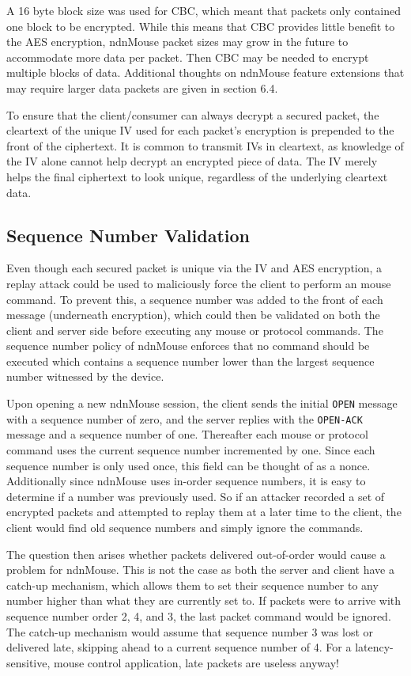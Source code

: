 \documentclass{sig-alternate}
\renewcommand\_{\textunderscore\allowbreak}  %
\begin{document}
A 16 byte block size was used for CBC, which meant that packets only contained one block to be encrypted. While this means that CBC provides little benefit to the AES encryption, ndnMouse packet sizes may grow in the future to accommodate more data per packet. Then CBC may be needed to encrypt multiple blocks of data. Additional thoughts on ndnMouse feature extensions that may require larger data packets are given in section 6.4.

To ensure that the client/consumer can always decrypt a secured packet, the cleartext of the unique IV used for each packet's encryption is prepended to the front of the ciphertext. It is common to transmit IVs in cleartext, as knowledge of the IV alone cannot help decrypt an encrypted piece of data. The IV merely helps the final ciphertext to look unique, regardless of the underlying cleartext data.

\subsection{Sequence Number Validation}
Even though each secured packet is unique via the IV and AES encryption, a replay attack could be used to maliciously force the client to perform an mouse command. To prevent this, a sequence number was added to the front of each message (underneath encryption), which could then be validated on both the client and server side before executing any mouse or protocol commands. The sequence number policy of ndnMouse enforces that no command should be executed which contains a sequence number lower than the largest sequence number witnessed by the device. 

Upon opening a new ndnMouse session, the client sends the initial \texttt{OPEN} message with a sequence number of zero, and the server replies with the \texttt{OPEN-ACK} message and a sequence number of one. Thereafter each mouse or protocol command uses the current sequence number incremented by one. Since each sequence number is only used once, this field can be thought of as a nonce. Additionally since ndnMouse uses in-order sequence numbers, it is easy to determine if a number was previously used. So if an attacker recorded a set of encrypted packets and attempted to replay them at a later time to the client, the client would find old sequence numbers and simply ignore the commands.

The question then arises whether packets delivered out-of-order would cause a problem for ndnMouse. This is not the case as both the server and client have a catch-up mechanism, which allows them to set their sequence number to any number higher than what they are currently set to. If packets were to arrive with sequence number order 2, 4, and 3, the last packet command would be ignored. The catch-up mechanism would assume that sequence number 3 was lost or delivered late, skipping ahead to a current sequence number of 4. For a latency-sensitive, mouse control application, late packets are useless anyway!
\end{document}
